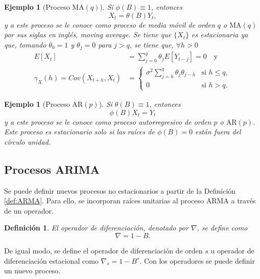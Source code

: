 \documentclass[12pt,twoside]{article}
\newtheorem{definition}[theorem]{Definición}
\newtheorem{example}[theorem]{Ejemplo}
\newcommand{\ar}{\text{AR}}
\newcommand{\ma}{\text{MA}}
\begin{document}
\begin{example}[Proceso $\ma(q)$]
    Si $\phi(B) \equiv 1$, entonces
    \begin{equation}\label{eq:ma_process}
        X_t = \theta(B)Y_t,
    \end{equation}
    y a este proceso se le conoce como proceso de media móvil de orden $q$ o $\ma(q)$ por sus siglas en inglés, \emph{moving average}. Se tiene que $\{X_t\}$ es estacionaria ya que, tomando $\theta_0 = 1$ y $\theta_j = 0$ para $j > q$, se tiene que, $\forall h > 0$
    \begin{align*}
        E[X_t] & = \sum_{j=0}^q \theta_j E[Y_{t-j}] = 0 \quad \text{y}\\
        \gamma_X(h) = Cov(X_{t+h}, X_t) & = \left\{\begin{array}{ll}
            \sigma^2 \sum_{j=h}^{q} \theta_j \theta_{j - h} & \text{si } h \leq q,  \\
            0 & \text{si } h > q.
        \end{array}\right.
    \end{align*}
\end{example}

\begin{example}[Proceso $\ar(p)$] Si $\theta(B)\equiv1$, entonces
\begin{equation}\label{eq:ar_process}
    \phi(B)X_t = Y_t
\end{equation}
y a este proceso se le conoce como proceso autorregresivo de orden $p$ o $\ar(p)$. Este proceso es estacionario solo si las raíces de $\phi(B) = 0$ están fuera del círculo unidad.
\end{example}


\subsection{Procesos ARIMA}
Se puede definir nuevos procesos no estacionarios a partir de la Definición \ref{def:ARMA}. Para ello, se incorporan raíces unitarias al proceso ARMA a través de un operador.


\begin{definition}
    El operador de diferenciación, denotado por $\nabla$, se define como
    \begin{equation*}
        \nabla = 1 -B.
    \end{equation*}
\end{definition}

De igual modo, se define el operador de diferenciación de orden $s$ u operador de diferenciación estacional como $\nabla_s = 1 - B^s$. Con los operadores se puede definir un nuevo proceso.
\end{document}
